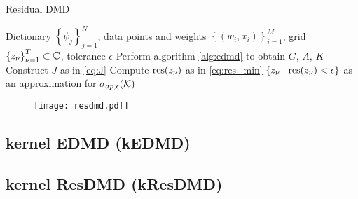 \begin{algorithm}
    \caption{Residual DMD}
    \label{alg:resdmd}
    \begin{algorithmic}[1]
        \Require Dictionary $\left\{ \psi_j \right\}_{j=1}^N$, 
            data points and weights $\left\{ (w_i, x_i) \right\}_{i=1}^M$, 
            grid $\left\{ z_\nu \right\}_{\nu=1}^T \subset \mathbb{C}$,
            tolerance $\epsilon$
        \State Perform algorithm \ref{alg:edmd} to obtain $G$, $A$, $K$
        \State Construct $J$ as in \ref{eq:J}
            \State Compute $\text{res} (z_\nu)$ as in \ref{eq:res_min}
        \EndFor
        \State \Return $\left\{ z_\nu \mid \text{res} (z_\nu) < \epsilon \right\}$
            as an approximation for $\sigma_{ap, \epsilon} (\mathcal{K})$
    \end{algorithmic}
\end{algorithm}

\begin{figure}
    \centering
    \texttt{[image: resdmd.pdf]}
    \caption{
        \todo{}
    }
\end{figure}


\subsection{kernel EDMD (kEDMD)}

\subsection{kernel ResDMD (kResDMD)}

